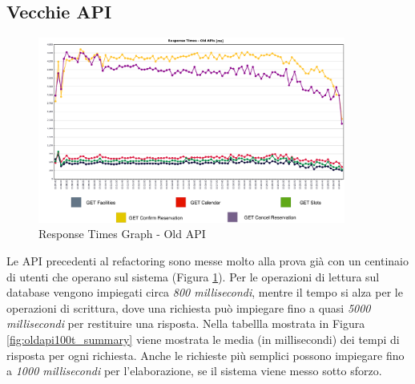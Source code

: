 \subsection{Vecchie API}
\begin{figure}
    \centering
    \includegraphics[width=0.90\textwidth]{images/04_1_old_api_response_graph_legend.pdf}
    \caption{Response Times Graph - Old API}
    \label{fig:oldapi100t_response}
\end{figure}
Le API precedenti al refactoring sono messe molto alla prova già con un centinaio di utenti che operano sul sistema (Figura \ref{fig:oldapi100t_response}). Per le operazioni di lettura sul database vengono impiegati circa \emph{800 millisecondi}, mentre il tempo si alza per le operazioni di scrittura, dove una richiesta può impiegare fino a quasi \emph{5000 millisecondi} per restituire una risposta.
Nella tabellla mostrata in Figura \ref{fig:oldapi100t_summary} viene mostrata le media (in millisecondi) dei tempi di risposta per ogni richiesta. Anche le richieste più semplici possono impiegare fino a \emph{1000 millisecondi} per l'elaborazione, se il sistema viene messo sotto sforzo.
